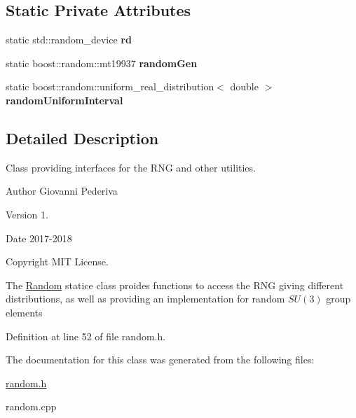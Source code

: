 \subsection*{Static Private Attributes}
\begin{DoxyCompactItemize}
\item 
static std\+::random\+\_\+device {\bfseries rd}\hypertarget{classRandom_a7206399225b174d8a582fbe005fdd147}{}\label{classRandom_a7206399225b174d8a582fbe005fdd147}

\item 
static boost\+::random\+::mt19937 {\bfseries random\+Gen}\hypertarget{classRandom_a87c5a2f785d8bc7ee8710c90be207e0f}{}\label{classRandom_a87c5a2f785d8bc7ee8710c90be207e0f}

\item 
static boost\+::random\+::uniform\+\_\+real\+\_\+distribution$<$ double $>$ {\bfseries random\+Uniform\+Interval}\hypertarget{classRandom_a8855414604d169c7a0a3b283f353a315}{}\label{classRandom_a8855414604d169c7a0a3b283f353a315}

\end{DoxyCompactItemize}


\subsection{Detailed Description}
Class providing interfaces for the R\+NG and other utilities. 

\begin{DoxyAuthor}{Author}
Giovanni Pederiva 
\end{DoxyAuthor}
\begin{DoxyVersion}{Version}
1. 
\end{DoxyVersion}
\begin{DoxyDate}{Date}
2017-\/2018 
\end{DoxyDate}
\begin{DoxyCopyright}{Copyright}
M\+IT License.
\end{DoxyCopyright}
The \hyperlink{classRandom}{Random} statice class proides functions to access the R\+NG giving different distributions, as well as providing an implementation for random $SU(3)$ group elements 

Definition at line 52 of file random.\+h.



The documentation for this class was generated from the following files\+:\begin{DoxyCompactItemize}
\item 
\hyperlink{random_8h}{random.\+h}\item 
random.\+cpp\end{DoxyCompactItemize}
